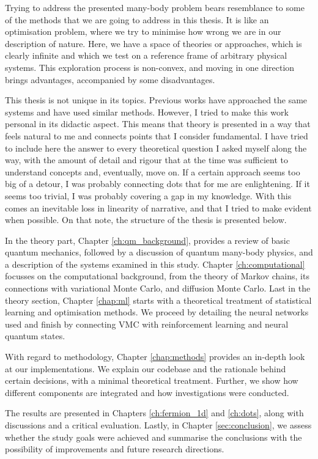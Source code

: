 Trying to address the presented many-body problem bears resemblance to some of the methods that we are going to address in this thesis. It is like an optimisation problem, where we try to minimise how wrong we are in our description of nature. Here, we have a space of theories or approaches, which is clearly infinite and which we test on a reference frame of arbitrary physical systems. This exploration process is non-convex, and moving in one direction brings advantages, accompanied by some disadvantages.

This thesis is not unique in its topics. Previous works have approached the same systems and have used similar methods. However, I tried to make this work personal in its didactic aspect. This means that theory is presented in a way that feels natural to me and connects points that I consider fundamental. I have tried to include here the answer to every theoretical question I asked myself along the way, with the amount of detail and rigour that at the time was sufficient to understand concepts and, eventually, move on. If a certain approach seems too big of a detour, I was probably connecting dots that for me are enlightening. If it seems too trivial, I was probably covering a gap in my knowledge. With this comes an inevitable loss in linearity of narrative, and that I tried to make evident when possible. On that note, the structure of the thesis is presented below. 

In the theory part, Chapter \ref{ch:qm_background}, provides a review of basic quantum mechanics, followed by a discussion of quantum many-body physics, and a description of the systems examined in this study. Chapter \ref{ch:computational} focusses on the computational background, from the theory of Markov chains, its connections with variational Monte Carlo, and diffusion Monte Carlo. Last in the theory section, Chapter \ref{chap:ml} starts with a theoretical treatment of statistical learning and optimisation methods. We proceed by detailing the neural networks used and finish by connecting VMC with reinforcement learning and neural quantum states.

With regard to methodology, Chapter \ref{chap:methods} provides an in-depth look at our implementations. We explain our codebase and the rationale behind certain decisions, with a minimal theoretical treatment. Further, we show how different components are integrated and how investigations were conducted.

The results are presented in Chapters \ref{ch:fermion_1d} and \ref{ch:dots}, along with discussions and a critical evaluation. Lastly, in Chapter \ref{sec:conclusion}, we assess whether the study goals were achieved and summarise the conclusions with the possibility of improvements and future research directions.









